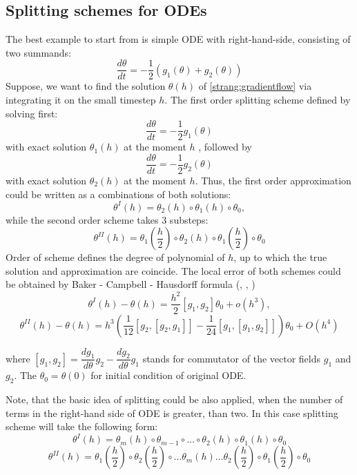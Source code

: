 \documentclass{article} %
\begin{document}
\subsection{Splitting schemes for ODEs}
The best example to start from is simple ODE with right-hand-side, consisting of two summands:
\begin{equation}
    \dfrac{d \theta}{d t} = - \frac{1}{2} \left( g_1(\theta) + g_2(\theta)\right)
    \label{strang:gradientflow}
\end{equation}
Suppose, we want to find the solution $\theta(h)$ of \eqref{strang:gradientflow} via integrating it on the small timestep $h$. The first order splitting scheme defined by solving first:
$$
\dfrac{d \theta}{d t} = - \frac{1}{2} g_1(\theta)
$$
with exact solution $\theta_1(h)$ at the moment $h$ , followed by
$$
\dfrac{d \theta}{d t} = - \frac{1}{2} g_2(\theta)
$$
with exact solution $\theta_2(h)$ at the moment $h$. Thus, the first order approximation could be written as a combinations of both solutions:
$$
\theta^I(h) = \theta_2(h) \circ \theta_1(h) \circ \theta_0,
$$
while the second order scheme takes 3 substeps:
$$
\theta^{II}(h) = \theta_1\left(\frac{h}{2}\right) \circ \theta_2(h) \circ \theta_1\left(\frac{h}{2}\right) \circ \theta_0
$$
Order of scheme defines the degree of polynomial of $h$, up to which the true solution and approximation are coincide. The local error of both schemes could be obtained by Baker - Campbell - Hausdorff formula (\cite{baker1901further}, \cite{campbell1896law}, \cite{hausdorff1906symbolische})
\begin{equation}
    \label{strang:lie_error}
    \theta^I(h) - \theta(h) = \dfrac{h^2}{2} \left[g_{1}, g_{2}\right] \theta_0 + o(h^3),
\end{equation}
\begin{equation}
    \label{strang:marchuk_error}
    \theta^{II}(h) - \theta(h) = h^{3} \left(\frac{1}{12}[g_2,[g_2, g_1]]-\frac{1}{24}[g_1,[g_1, g_2]]\right)\theta_0+O\left(h^{4}\right)
\end{equation}

where $\left[ g_1, g_2\right] = \dfrac{d g_1}{d \theta} g_2 - \dfrac{d g_2}{d \theta} g_1 $ stands for commutator of the vector fields $g_1$ and $g_2$. The $\theta_0 = \theta(0)$ for initial condition of original ODE.

Note, that the basic idea of splitting could be also applied, when the number of terms in the right-hand side of ODE is greater, than two. In this case splitting scheme will take the following form:
\begin{equation}\label{strang:marchuk}
	\theta^I(h) = \theta_m(h) \circ \theta_{m-1} \circ \ldots \circ \theta_2(h) \circ \theta_1(h) \circ \theta_0
\end{equation}
\begin{equation}\label{strang:strang}
	\theta^{II}(h) = \theta_1\left(\frac{h}{2}\right) \circ \theta_2\left(\frac{h}{2}\right) \circ\ldots \theta_m(h) \ldots \theta_2\left(\frac{h}{2}\right) \circ \theta_1\left(\frac{h}{2}\right) \circ \theta_0
\end{equation}
\end{document}
